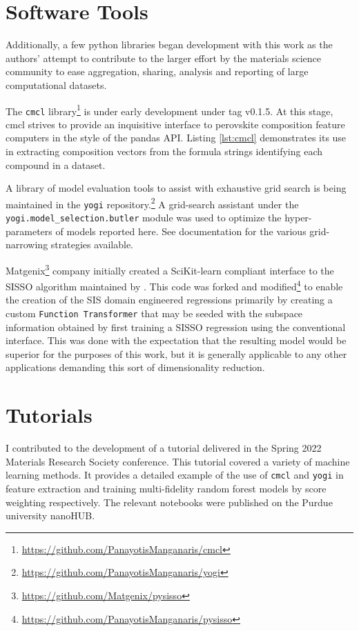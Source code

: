 \section{Software Tools}
\label{sec:org85fe2a5}
Additionally, a few python libraries began development with this work as the authors' attempt to contribute to the larger effort by the materials science community to ease aggregation, sharing, analysis and reporting of large computational datasets.

The \texttt{cmcl} library\footnote{\url{https://github.com/PanayotisManganaris/cmcl}} is under early development under tag v0.1.5.
At this stage, cmcl strives to provide an inquisitive interface to perovskite composition feature computers in the style of the pandas API.
Listing \ref{lst:cmcl} demonstrates its use in extracting composition vectors from the formula strings identifying each compound in a dataset.

A library of model evaluation tools to assist with exhaustive grid search is being maintained in the \texttt{yogi} repository.\footnote{\url{https://github.com/PanayotisManganaris/yogi}}
A grid-search assistant under the \texttt{yogi.model\_selection.butler} module was used to optimize the hyper-parameters of models reported here.
See documentation for the various grid-narrowing strategies available.

Matgenix\footnote{\url{https://github.com/Matgenix/pysisso}} company initially created a SciKit-learn compliant interface to the SISSO algorithm maintained by \textcite{ouyang-2018-sisso}.
This code was forked and modified\footnote{\url{https://github.com/PanayotisManganaris/pysisso}} to enable the creation of the SIS domain engineered regressions primarily by creating a custom \texttt{Function Transformer} that may be seeded with the subspace information obtained by first training a SISSO regression using the conventional interface.
This was done with the expectation that the resulting model would be superior for the purposes of this work, but it is generally applicable to any other applications demanding this sort of dimensionality reduction.

\section{Tutorials}
\label{sec:org5689b18}
I contributed to the development of a tutorial delivered in the Spring 2022 Materials Research Society conference.
This tutorial covered a variety of machine learning methods.
It provides a detailed example of the use of \texttt{cmcl} and \texttt{yogi} in feature extraction and training multi-fidelity random forest models by score weighting respectively.
The relevant notebooks were published on the Purdue university nanoHUB.
